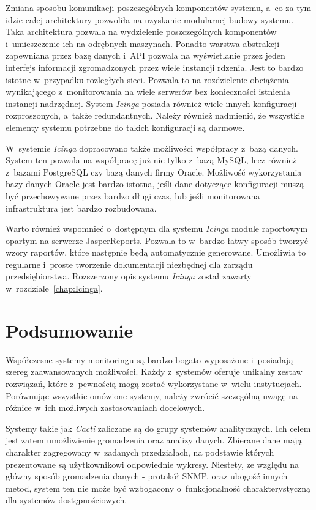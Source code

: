 Zmiana sposobu komunikacji poszczególnych komponentów systemu, a~co za
tym idzie całej architektury pozwoliła na uzyskanie modularnej budowy
systemu. Taka architektura pozwala na wydzielenie poszczególnych
komponentów i~umieszczenie ich na odrębnych maszynach. Ponadto warstwa
abstrakcji zapewniana przez bazę danych i~API pozwala na wyświetlanie
przez jeden interfejs informacji zgromadzonych przez wiele instancji
rdzenia. Jest to bardzo istotne w~przypadku rozległych sieci. Pozwala
to na rozdzielenie obciążenia wynikającego z~monitorowania na wiele
serwerów bez konieczności istnienia instancji nadrzędnej. System
{\em Icinga} posiada również wiele innych konfiguracji rozproszonych,
a~także redundantnych. Należy również nadmienić, że wszystkie elementy
systemu potrzebne do takich konfiguracji są darmowe.

W~systemie {\em Icinga} dopracowano także możliwości współpracy
z~bazą danych. System ten pozwala na współpracę już nie tylko z~bazą
MySQL, lecz również z~bazami PostgreSQL czy bazą danych firmy
Oracle. Możliwość wykorzystania bazy danych Oracle jest bardzo
istotna, jeśli dane dotyczące konfiguracji muszą być przechowywane
przez bardzo długi czas, lub jeśli monitorowana infrastruktura jest
bardzo rozbudowana.

Warto również wspomnieć o~dostępnym dla systemu {\em Icinga} module
raportowym opartym na serwerze
JasperReports\cite{www:JasperReports}. Pozwala to w~bardzo łatwy
sposób tworzyć wzory raportów, które następnie będą automatycznie
generowane. Umożliwia to regularne i~proste tworzenie dokumentacji
niezbędnej dla zarządu przedsiębiorstwa. Rozszerzony opis systemu
{\em Icinga} został zawarty w~rozdziale~\ref{chap:Icinga}.

\section[Podsumowanie][Podsumowanie]{Podsumowanie}

Współczesne systemy monitoringu są bardzo bogato wyposażone
i~posiadają szereg zaawansowanych możliwości. Każdy z~systemów oferuje
unikalny zestaw rozwiązań, które z~pewnością mogą zostać wykorzystane
w~wielu instytucjach. Porównując wszystkie omówione systemy, należy
zwrócić szczególną uwagę na różnice w~ich możliwych zastosowaniach
docelowych.

Systemy takie jak {\em Cacti} zaliczane są do grupy systemów
analitycznych. Ich celem jest zatem umożliwienie gromadzenia oraz
analizy danych. Zbierane dane mają charakter zagregowany w~zadanych
przedziałach, na podstawie których prezentowane są użytkownikowi
odpowiednie wykresy. Niestety, ze względu na główny sposób gromadzenia
danych - protokół SNMP, oraz ubogość innych metod, system ten nie może
być wzbogacony o~funkcjonalność charakterystyczną dla systemów
dostępnościowych.

